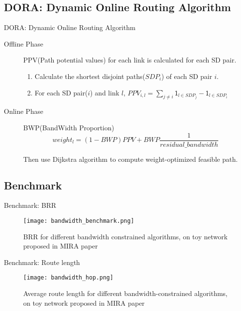 \documentclass{beamer}
\begin{document}
\subsection{DORA: Dynamic Online Routing Algorithm}
\begin{frame}{DORA: Dynamic Online Routing Algorithm}
    \begin{description}
        \item[Offline Phase] PPV(Path potential values) for each link is calculated for each SD pair. 
            \begin{enumerate}
                \item Calculate the shortest disjoint paths($SDP_i$) of each SD pair $i$.
                \item For each SD pair($i$) and link $l$, $PPV_{i, l} = \sum_{j \neq i}{\mathsf{1}_{l \in SDP_j}} - \mathsf{1}_{l \in SDP_i} $
            \end{enumerate}
        \item[Online Phase] BWP(BandWidth Proportion)
        \begin{equation}
            weight_l = (1 - BWP) PPV + BWP \frac{1}{residual\_bandwidth}
        \end{equation}
        
        Then use Dijkstra algorithm to compute weight-optimized feasible path.
    \end{description}
\end{frame}

\subsection{Benchmark}
\begin{frame}{Benchmark: BRR}
    \begin{figure}
        \texttt{[image: bandwidth\_benchmark.png]}
        \caption{BRR for different bandwidth constrained algorithms, on toy network proposed in MIRA paper}
    \end{figure}
    
\end{frame}

\begin{frame}{Benchmark: Route length}
    \begin{figure}
        \texttt{[image: bandwidth\_hop.png]}
        \caption{Average route length for different bandwidth-constrained algorithms, on toy network proposed in MIRA paper}
    \end{figure}
    
\end{frame}
\end{document}
